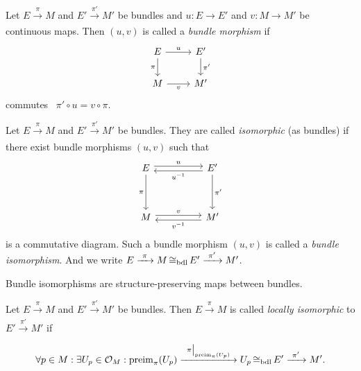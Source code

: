 \begin{definition}\label{def:bundle-morphism}
	Let \(E \xrightarrow[]{\ \pi\ } M\) and \(E' \xrightarrow[]{\ \pi'\ } M'\) be bundles and \(u: E \to E'\) and \(v: M \to M'\) be continuous maps. Then \((u, v)\) is called a \emph{bundle morphism} if
	\begin{equation}
		\begin{tikzcd}
			E \arrow[r, "u"] \arrow[d, "\pi"'] & E' \arrow[d, "\pi'"] \\
			M \arrow[r, "v"']                  & M'
		\end{tikzcd}
	\end{equation}
	commutes \ie\ \(\pi' \circ u = v \circ \pi\).
\end{definition}

\begin{definition}\label{def:bundle-isomorphism}
	Let \(E \xrightarrow[]{\ \pi\ } M\) and \(E' \xrightarrow[]{\ \pi'\ } M'\) be bundles. They are called \emph{isomorphic} (as bundles) if there exist bundle morphisms \((u, v)\) such that
	\begin{equation}
		\begin{tikzcd}
			E \arrow[rr,shift left,"u"] \arrow[dd,"\pi"'] & & E' \arrow[ll,shift left,"u^{-1}"] \arrow[dd,"\pi'"] \\
			& & \\
			M \arrow[rr,shift left,"v"] & & M' \arrow[ll,shift left,"v^{-1}"]
		\end{tikzcd}
	\end{equation}
	is a commutative diagram. Such a bundle morphism \((u, v)\) is called a \emph{bundle isomorphism}. And we write \(E \xrightarrow[]{\ \pi\ } M \operatorname{\cong_{\text{bdl}}} E' \xrightarrow[]{\ \pi'\ } M'\).
\end{definition}

Bundle isomorphisms are structure-preserving maps between bundles.

\begin{definition}
	Let \(E \xrightarrow[]{\ \pi\ } M\) and \(E' \xrightarrow[]{\ \pi'\ } M'\) be bundles. Then \(E \xrightarrow[]{\ \pi\ } M\) is called \emph{locally isomorphic} to \(E' \xrightarrow[]{\ \pi'\ } M'\) if
	\begin{equation}
		\forall p \in M: \exists U_p \in \O_M: \preimg_{\pi}(U_p) \xrightarrow[]{\ \eval{\pi}_{\preimg_{\pi}(U_p)}\ } U_p \bdlIso E' \xrightarrow[]{\ \pi'\ } M'.
	\end{equation}
\end{definition}

